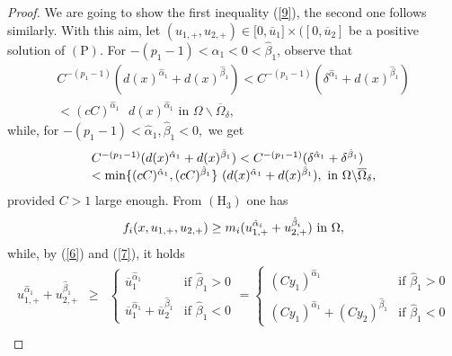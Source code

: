 \documentclass[11pt]{amsart}
\theoremstyle{definition}
\theoremstyle{remark}
\numberwithin{equation}{section}
\begin{document}
\begin{proof}
We are going to show the first inequality (\ref{9}), the second one follows
similarly. With this aim, let $(u_{1,+},u_{2,+})\in \lbrack 0,\overline{u}%
_{1}]\times ([0,\overline{u}_{2}]$ be a positive solution of $(\mathrm{P})$.
For $-(p_{1}-1)<\hat{\alpha}_{1}<0<\hat{\beta}_{1}$, observe that 
\begin{equation*}
\begin{array}{l}
C^{-(p_{1}-1)}(d(x)^{\hat{\alpha}_{1}}+d(x)^{\hat{\beta}%
_{1}})<C^{-(p_{1}-1)}(\delta ^{\hat{\alpha}_{1}}+d(x)^{\hat{\beta}_{1}}) \\ 
<(cC)^{\hat{\alpha}_{1}}\text{ }d(x)^{\hat{\alpha}_{1}}\text{ \ in }\Omega
\backslash \overline{\Omega }_{\delta },%
\end{array}%
\end{equation*}%
while, for $-(p_{1}-1)<\hat{\alpha}_{1},\hat{\beta}_{1}<0,$ we get 
\begin{equation*}
\begin{array}{l}
C^{-(p_{1}-1)}(d(x)^{\hat{\alpha}_{1}}+d(x)^{\hat{\beta}%
_{1}})<C^{-(p_{1}-1)}(\delta ^{\hat{\alpha}_{1}}+\delta ^{\hat{\beta}_{1}})
\\ 
<\min \{(cC)^{\hat{\alpha}_{1}},(cC)^{\hat{\beta}_{1}}\}\text{ }(d(x)^{\hat{%
\alpha}_{1}}+d(x)^{\hat{\beta}_{1}}),\text{ in }\Omega \backslash \overline{%
\Omega }_{\delta },%
\end{array}%
\end{equation*}%
provided $C>1$ large enough. From $(\mathrm{H}_{3})$ one has 
\begin{equation*}
f_{i}(x,u_{1,+},u_{2,+})\geq m_{i}(u_{1,+}^{\hat{\alpha}_{i}}+u_{2,+}^{\hat{%
\beta}_{i}})\text{ in }\Omega ,
\end{equation*}%
while, by (\ref{6}) and (\ref{7}), it holds 
\begin{eqnarray*}
u_{1,+}^{\hat{\alpha}_{1}}+u_{2,+}^{\hat{\beta}_{1}} &\geq &\left\{ 
\begin{array}{ll}
\overline{u}_{1}^{\hat{\alpha}_{1}} & \text{if }\hat{\beta}_{1}>0 \\ 
\overline{u}_{1}^{\hat{\alpha}_{1}}+\overline{u}_{2}^{\hat{\beta}_{1}} & 
\text{if }\hat{\beta}_{1}<0%
\end{array}%
\right. =\left\{ 
\begin{array}{ll}
(Cy_{1})^{\hat{\alpha}_{1}} & \text{if }\hat{\beta}_{1}>0 \\ 
(Cy_{1})^{\hat{\alpha}_{1}}+(Cy_{2})^{\hat{\beta}_{1}} & \text{if }\hat{\beta%
}_{1}<0%
\end{array}%
\right. \\

\end{eqnarray*}
\end{proof}
\end{document}
